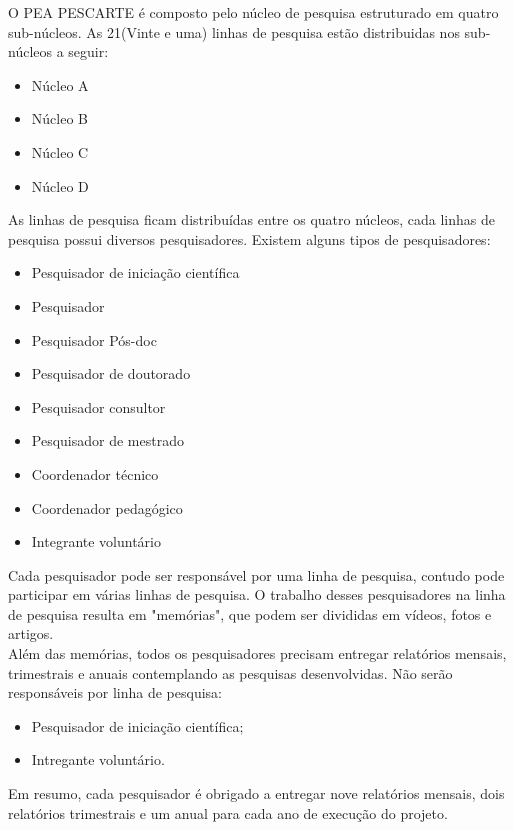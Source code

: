 \documentclass[11pt]{../../classes/ifscarticle}
\begin{document}
O PEA PESCARTE é composto pelo núcleo de pesquisa estruturado
em quatro sub-núcleos. As 21(Vinte e uma) linhas de pesquisa
estão distribuidas nos sub-núcleos a seguir:
\begin{itemize}
    \item Núcleo A
    \item Núcleo B
    \item Núcleo C
    \item Núcleo D
\end{itemize}
As linhas de pesquisa ficam distribuídas entre os quatro núcleos,
cada linhas de pesquisa possui diversos pesquisadores.
Existem alguns tipos de pesquisadores:
\begin{itemize}
    \item Pesquisador de iniciação científica
    \item Pesquisador
    \item Pesquisador Pós-doc
    \item Pesquisador de doutorado
    \item Pesquisador consultor
    \item Pesquisador de mestrado
    \item Coordenador técnico
    \item Coordenador pedagógico
    \item Integrante voluntário
\end{itemize}
\clearpage
Cada pesquisador pode ser responsável por uma linha de pesquisa,
contudo pode participar em várias linhas de pesquisa.
O trabalho desses pesquisadores na linha de pesquisa resulta
em "memórias", que podem ser divididas em vídeos, fotos e artigos.\\
Além das memórias, todos os pesquisadores precisam entregar relatórios mensais,
trimestrais e anuais contemplando as pesquisas desenvolvidas. Não serão responsáveis
por linha de pesquisa:
\begin{itemize}
    \item Pesquisador de iniciação científica;
    \item Intregante voluntário.
\end{itemize}
Em resumo, cada pesquisador é obrigado a entregar nove relatórios mensais,
dois relatórios trimestrais e um anual para cada ano de execução do projeto.
\end{document}
